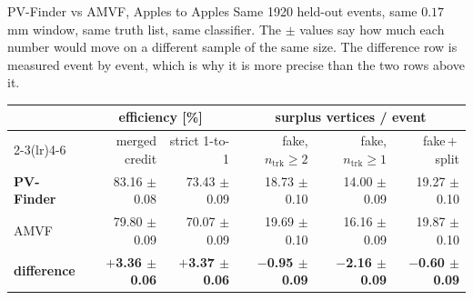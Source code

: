 \documentclass[xcolor=table,aspectratio=169]{beamer}
\newcommand{\ntrk}{\ensuremath{n_\mathrm{trk}}}
\begin{document}
\begin{frame}{PV-Finder vs AMVF, Apples to Apples}
    \vspace{-0.2em}
    \centering
    \scriptsize
    Same 1920 held-out events, same $0.17$\,mm window, same truth list, same
    classifier. The $\pm$ values say how much each number would move on a different
    sample of the same size. The difference row is measured event by event, which is
    why it is more precise than the two rows above it.
    \vspace{0.35em}

    \setlength{\tabcolsep}{7pt}
    \begin{tabular}{l rr rrr}
        \toprule
        & \multicolumn{2}{c}{\textcolor{black!55}{efficiency [\%]}}
        & \multicolumn{3}{c}{\textcolor{black!55}{surplus vertices / event}} \\
        \cmidrule(lr){2-3}\cmidrule(lr){4-6}
        & merged credit & strict 1-to-1
        & fake, $\ntrk\!\geq\!2$ & fake, $\ntrk\!\geq\!1$ & fake\,$+$\,split \\
        \midrule
        \textbf{PV-Finder} & 83.16 $\pm$ 0.08 & 73.43 $\pm$ 0.09 & 18.73 $\pm$ 0.10 & 14.00 $\pm$ 0.09 & 19.27 $\pm$ 0.10 \\
        AMVF               & 79.80 $\pm$ 0.09 & 70.07 $\pm$ 0.09 & 19.69 $\pm$ 0.10 & 16.16 $\pm$ 0.09 & 19.87 $\pm$ 0.10 \\
        \midrule
        \rowcolor{black!8}
        \textbf{difference}
        & \textcolor{pennred}{\textbf{$+$3.36 $\pm$ 0.06}} & \textbf{$+$3.37 $\pm$ 0.06}
        & \textbf{$-$0.95 $\pm$ 0.09} & \textbf{$-$2.16 $\pm$ 0.09} & \textbf{$-$0.60 $\pm$ 0.09} \\
        \bottomrule
    \end{tabular}
    \vspace{0.75em}


\end{frame}
\end{document}
